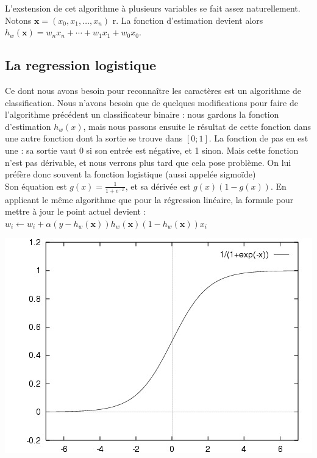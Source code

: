 L'exstension de cet algorithme à plusieurs variables se fait assez naturellement. Notons $\textbf{x} = (x_0, x_1, \ldots, x_n)$ r. La fonction d'estimation devient alors $h_w(\textbf{x}) = w_nx_n + \cdots + w_1x_1 + w_0x_0$.

\subsection{La regression logistique}

Ce dont nous avons besoin pour reconnaître les caractères est un algorithme de classification. Nous n'avons besoin que de quelques modifications pour faire de l'algorithme précédent un classificateur binaire : nous gardons la fonction d'estimation $h_w(x)$, mais nous passons ensuite le résultat de cette fonction dans une autre fonction dont la sortie se trouve dans $[0;1]$.  La fonction de pas en est une : sa sortie vaut 0 si son entrée est négative, et 1 sinon. Mais cette fonction n'est pas dérivable, et nous verrons plus tard que cela pose problème. On lui préfère donc souvent la fonction logistique (aussi appelée sigmoïde)\\

Son équation est $g(x) = \frac{1}{1 + e^{-x}}$, et sa dérivée est $g(x)(1 - g(x))$. En applicant le même algorithme que pour la régression linéaire, la formule pour mettre à jour le point actuel devient :\\

$w_i \leftarrow w_i + \alpha (y - h_w(\textbf{x}))
h_w(\textbf{x})(1 - h_w(\textbf{x}))x_i$\\
\begin{center}
\includegraphics[scale=0.4]{chapters/Pictures/logisticregression.jpg}\\
\end{center}

